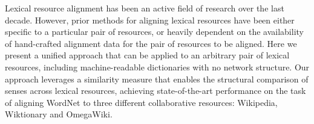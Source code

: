 Lexical resource alignment has been an active field of research over the last decade. However, prior methods for aligning lexical resources have been either specific to a particular pair of resources, or heavily dependent on the availability of hand-crafted alignment data for the pair of resources to be aligned. Here we present a unified approach that can be applied to an arbitrary pair of lexical resources, including machine-readable dictionaries with no network structure. Our approach leverages a similarity measure that enables the structural comparison of senses across lexical resources, achieving state-of-the-art performance on the task of aligning WordNet to three different collaborative resources: Wikipedia, Wiktionary and OmegaWiki.
